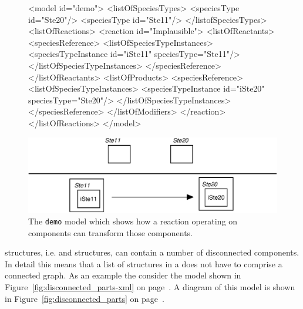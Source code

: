 \documentclass{cekarticle}
\begin{document}
\begin{figure}[h]

\begin{example}
<model id="demo">
    <listOfSpeciesTypes>
        <speciesType id="Ste20"/>
        <speciesType id="Ste11"/>
    </listofSpeciesTypes>
    <listOfReactions>
        <reaction id="Implausible">
            <listOfReactants>
                <speciesReference>
                    <listOfSpeciesTypeInstances>
                        <speciesTypeInstance id="iSte11" speciesType="Ste11"/>
                    </listOfSpeciesTypeInstances>
                </speciesReference>
            </listOfReactants>
            <listOfProducts>
                <speciesReference>
                    <listOfSpeciesTypeInstances>
                        <speciesTypeInstance id="iSte20" speciesType="Ste20"/>
                    </listOfSpeciesTypeInstances>
                </speciesReference>
            </listOfModifiers>
        </reaction>
    </listOfReactions>
</model>
\end{example}
  \vspace*{8pt}
  \centering
  \includegraphics[scale = 0.7]{demo.eps}
  \caption{The \texttt{demo} model which shows how a reaction operating on
  components can transform those components.}
  \label{fig:demo}
\end{figure}

 structures, i.e.  and  structures,
can contain a number of disconnected components.  In detail this means that a list of 
structures in a  does not have to comprise a connected graph.  As an example the
consider the model shown in Figure~\ref{fig:disconnected_parts-xml} on
page~\pageref{fig:disconnected_parts-xml}.  A diagram of this model is shown in
Figure~\ref{fig:disconnected_parts} on page~\pageref{fig:disconnected_parts}.
\end{document}
